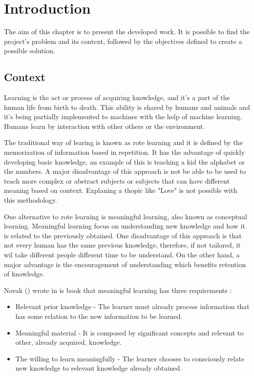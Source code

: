 % 
\chapter{Introduction} %
\label{chap:Chapter1} %

The aim of this chapter is to present the developed work.
It is possible to find the project's problem and its context, followed by the objectives defined to create a possible solution.

\section{Context}

Learning is the act or process of acquiring knowledge, and it's a part of the human life from birth to death.
This ability is shared by humans and animals and it's being partially implemented to machines with the help of machine learning.
Humans learn by interaction with other others or the environment.

The traditional way of learing is known as rote learning and it is defined by the memorization of information based in repetition.
It has the advantage of quickly developing basic knowledge, an example of this is teaching a kid the alphabet or the numbers.
A major disadvantage of this approach is not be able to be used to teach more complex or abstract subjects or subjects that can have different meaning based on context.
Explaning a thopic like "Love" is not possible with this methodology.

One alternative to rote learning is meaningful learning, also known as conceptual learning.
Meaningful learning focus on understanding new knowledge and how it is related to the previously obtained.
One disadvantage of this approach is that not every human has the same previous knowledge, therefore, if not tailored, it wil take different people different time to be understand. 
On the other hand, a major advantage is the encouragement of understanding which benefits retention of knowledge.

Novak (\citeyear{novak_2012}) wrote in is book that meaningful learning has three requirements : 

\begin{itemize}
    \item Relevant prior knowledge - The learner must already process information that has some relation to the new information to be learned.
    \item Meaningful material - It is composed by significant concepts and relevant to other, already acquired, knowledge.
    \item The willing to learn meaningfully - The learner chooses to consciously relate new knowledge to relevant knowledge already obtained.
\end{itemize}

